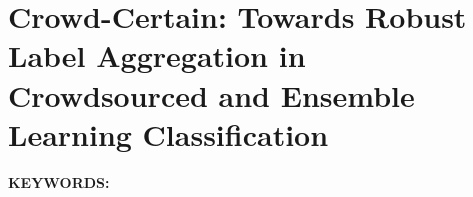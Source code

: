 \renewcommand{\chapterpath}[1]{Chapters/crowd/#1}
\renewcommand{\figurepath}[1]{Chapters/crowd/figures/#1}
% 

\chapter{Crowd-Certain: Towards Robust Label Aggregation in Crowdsourced and Ensemble Learning Classification}\label{ch:crowd}

%
\textbf{KEYWORDS:\ } %

\newpage

